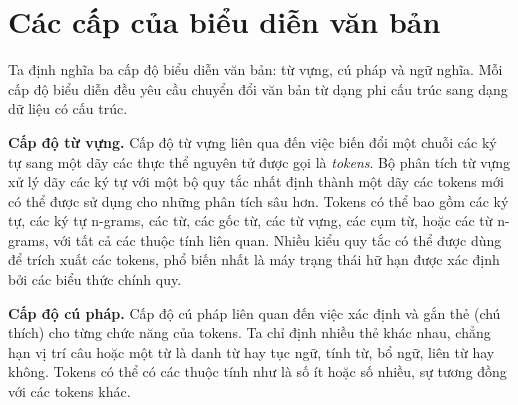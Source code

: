 \documentclass[14pt, a4paper]{article}
\numberwithin{equation}{section}
\numberwithin{figure}{section}
\numberwithin{dl}{section}
\numberwithin{md}{section}
\numberwithin{bd}{section}
\numberwithin{dn}{section}
\numberwithin{hq}{section}
\begin{document}
    \section{Các cấp của biểu diễn văn bản}

    Ta định nghĩa ba cấp độ biểu diễn văn bản: từ vựng, cú pháp và ngữ nghĩa.
    Mỗi cấp độ biểu diễn đều yêu cầu chuyển đổi văn bản từ dạng phi cấu trúc sang dạng dữ liệu có cấu trúc.

    \textbf{Cấp độ từ vựng.} Cấp độ từ vựng liên qua đến việc biến đổi một chuỗi các ký tự sang một dãy các thực thể nguyên tử được gọi là \textit{tokens}.
    Bộ phân tích từ vựng xử lý dãy các ký tự với một bộ quy tắc nhất định thành một dãy các tokens mới có thể được sử dụng cho những phân tích sâu hơn.
    Tokens có thể bao gồm các ký tự, các ký tự n-grams, các từ, các gốc từ, các từ vựng, các cụm từ, hoặc các từ n-grams, với tất cả các thuộc tính liên quan.
    Nhiều kiểu quy tắc có thể được dùng để trích xuất các tokens, phổ biến nhất là máy trạng thái hữ hạn được xác định bởi các biểu thức chính quy.

    \textbf{Cấp độ cú pháp.} Cấp độ cú pháp liên quan đến việc xác định và gắn thẻ (chú thích) cho từng chức năng của tokens.
    Ta chỉ định nhiều thẻ khác nhau, chẳng hạn vị trí câu hoặc một từ là danh từ hay tục ngữ, tính từ, bổ ngữ, liên từ hay không.
    Tokens có thể có các thuộc tính như là số ít hoặc số nhiều, sự tương đồng với các tokens khác.
    
\end{document}
